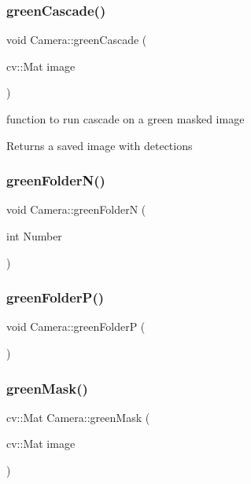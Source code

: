 \subsubsection{\texorpdfstring{green\+Cascade()}{greenCascade()}}
{\footnotesize\ttfamily void Camera\+::green\+Cascade (\begin{DoxyParamCaption}\item[{cv\+::\+Mat}]{image }\end{DoxyParamCaption})}



function to run cascade on a green masked image 

\begin{DoxyReturn}{Returns}
a saved image with detections 
\end{DoxyReturn}
\mbox{\label{classCamera_ac212835924bf4cee1b8c477a6b79f4d2}} 
\subsubsection{\texorpdfstring{green\+Folder\+N()}{greenFolderN()}}
{\footnotesize\ttfamily void Camera\+::green\+FolderN (\begin{DoxyParamCaption}\item[{int}]{Number }\end{DoxyParamCaption})}

\mbox{\label{classCamera_ac8f74b6c456d6fc7e9e83e746f8fc6c5}} 
\subsubsection{\texorpdfstring{green\+Folder\+P()}{greenFolderP()}}
{\footnotesize\ttfamily void Camera\+::green\+FolderP (\begin{DoxyParamCaption}{ }\end{DoxyParamCaption})}

\mbox{\label{classCamera_adf305e574ca94bce9435c217fef1501b}} 
\subsubsection{\texorpdfstring{green\+Mask()}{greenMask()}}
{\footnotesize\ttfamily cv\+::\+Mat Camera\+::green\+Mask (\begin{DoxyParamCaption}\item[{cv\+::\+Mat}]{image }\end{DoxyParamCaption})}



